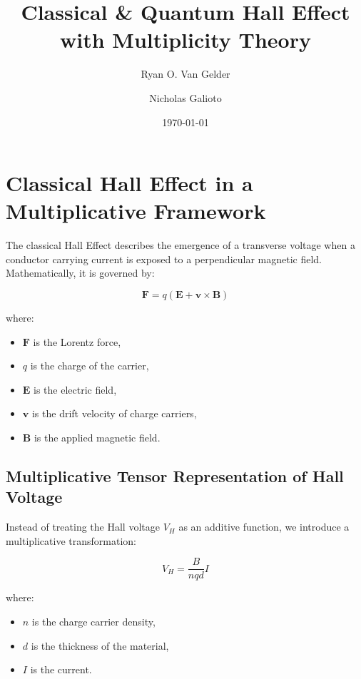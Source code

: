 \documentclass{article}
\theoremstyle{plain}
\begin{document}
\title{Classical \& Quantum Hall Effect \\ with Multiplicity Theory}

\author{Ryan O. Van Gelder}
\author{Nicholas Galioto}
\date{\today}

\maketitle
\section{Classical Hall Effect in a Multiplicative Framework}

The classical Hall Effect describes the emergence of a transverse voltage when a conductor carrying current is exposed to a perpendicular magnetic field. Mathematically, it is governed by:

\begin{equation}
\mathbf{F} = q (\mathbf{E} + \mathbf{v} \times \mathbf{B})
\end{equation}

where:
\begin{itemize}
\item $\mathbf{F}$ is the Lorentz force,
\item $q$ is the charge of the carrier,
\item $\mathbf{E}$ is the electric field,
\item $\mathbf{v}$ is the drift velocity of charge carriers,
\item $\mathbf{B}$ is the applied magnetic field.
\end{itemize}

\subsection{Multiplicative Tensor Representation of Hall Voltage}
Instead of treating the Hall voltage $V_H$ as an additive function, we introduce a multiplicative transformation:

\begin{equation}
V_H = \frac{B}{n q d} I
\end{equation}

where:
\begin{itemize}
\item $n$ is the charge carrier density,
\item $d$ is the thickness of the material,
\item $I$ is the current.
\end{itemize}
\end{document}

